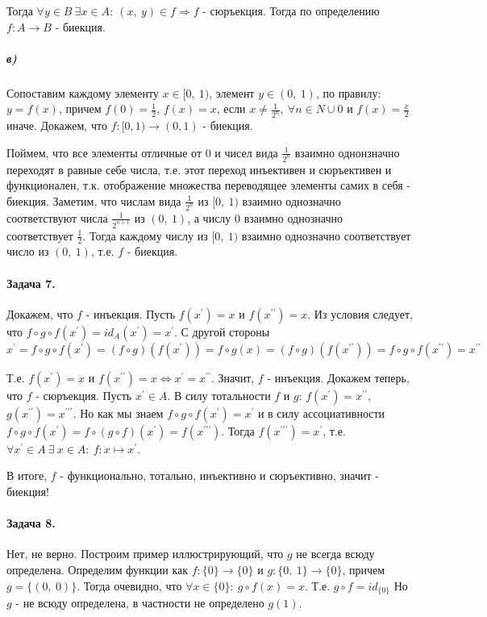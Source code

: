 \documentclass{article}
\newcommand{\xp}{x^{\prime}}
\newcommand{\xpp}{x^{\prime\prime}}
\newcommand{\xppp}{x^{\prime\prime\prime}}
\newcommand{\pair}[2]{(#1,\ #2)}
\begin{document}
		Тогда $\forall y \in B\ \exists x \in A:\ (x,\ y) \in f \Rightarrow f $ - сюръекция. Тогда по определению $f:A \rightarrow B$ - биекция. 
		
		\subparagraph{в)} Сопоставим каждому элементу $x \in [0,\ 1)$, элемент $y \in (0,\ 1)$, по правилу: $y = f(x)$, причем $f(0) = \frac{1}{2}$, $f(x) = x$, если $x \ne \frac{1}{2^n},\ \forall n \in N\cup{0}$ и $f(x) = \frac{x}{2}$ иначе. Докажем, что $f:[0, 1) \rightarrow (0, 1)$ - биекция.
		
		Поймем, что все элементы отличные от 0 и чисел вида $\frac{1}{2^n}$ взаимно однонзначно переходят в равные себе числа, т.е. этот переход инъективен и сюръективен и функционален, т.к. отображение множества переводящее элементы самих в себя - биекция. Заметим, что числам вида $\frac{1}{2^n}$ из $[0,\ 1)$ взаимно однозначно соответствуют числа $\frac{1}{2^{n + 1}}$ из $(0,\ 1)$, а числу 0 взаимно однозначно соответствует $\frac{1}{2}$. Тогда каждому числу из $[0, \ 1)$ взаимно однозначно соответствует число из $(0,\ 1)$, т.е. $f$ - биекция.
		
		
		\paragraph{Задача 7.} Докажем, что $f$ - инъекция. Пусть $f(x^{\prime}) = x$ и $f(x^{\prime\prime}) = x$. Из условия следует, что $f \circ g \circ f (x^{\prime}) = id_A (x^{\prime}) = x^{\prime}$. С другой стороны $$ x^{\prime} = f \circ g \circ f (x^{\prime}) = (f \circ g) (f(x^{\prime})) = f \circ g (x) = (f \circ g) (f(x^{\prime\prime})) = f \circ g \circ f (x^{\prime\prime}) = x^{\prime\prime}$$
		
		Т.е. $f(x^{\prime}) = x$ и $f(x^{\prime\prime}) = x \Leftrightarrow x^{\prime} = x^{\prime\prime}$. Значит, $f$ - инъекция. Докажем теперь, что $f$ - сюръекция. Пусть $\xp \in A$. В силу тотальности $f$ и $g$: $f(\xp) = \xpp$, $g(\xpp) = \xppp$. Но как мы знаем $f \circ g \circ f (\xp) = \xp$ и в силу ассоциативности $f \circ g \circ f (\xp) = f \circ (g \circ f ) (\xp) = f(\xppp)$. Тогда $f(\xppp) = \xp$, т.е. $\forall x^{\prime} \in A\ \exists\ x \in A:\ f:x \mapsto \xp$.
		
		В итоге, $f$ - функционально, тотально, инъективно и сюръективно, значит - биекция!
		
		\paragraph{Задача 8.} 
		Нет, не верно. Построим пример иллюстрирующий, что $g$ не всегда всюду определена. Определим функции как $f:\{0\} \rightarrow \{0\}$ и $g:\{0,\ 1\} \rightarrow \{0\}$, причем $g = \{\pair{0}{0}\}$. Тогда очевидно, что $\forall x \in \{0\}:\ g \circ f (x) = x$. Т.е. $g \circ f = id_{\{0\}}$ Но $g$ - не всюду определена, в частности не определено $g(1)$.
\end{document}
